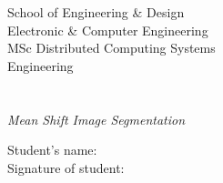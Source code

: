 \begin{titlepage}
    \begin{center}
        \large  
		\vspace*{1cm}
		{School of Engineering \& Design}\\
		{Electronic \& Computer Engineering}\\
		\vspace{1.2cm}
		{MSc Distributed Computing Systems}\\
		{Engineering}\\
		\vspace{2cm}
		\huge
		{\myUni}\\
		\vspace{2.5cm}
		\Huge
		\begingroup
			\color{seccolor}{\myTitle}\\
			\textit{\large{Mean Shift Image Segmentation}} \\
		\endgroup	
		\vspace{4.5cm}
		\large
	\begin{flushleft}
		{Student's name: }\\
		\vspace{0.5cm}
	   	{Signature of student: }\\
	 \end{flushleft}
		
		\vfill
		
		\normalsize

    \end{center}
\end{titlepage}        
